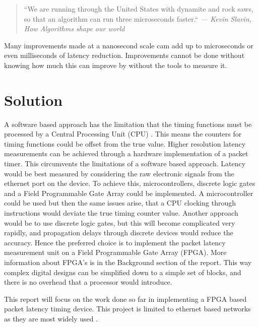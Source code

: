 \begin{quote}
    \centering
    ``We are running through the United States with dynamite and rock saws, so that an algorithm can
    run three microseconds faster.`` \em --- Kevin Slavin, How Algorithms shape our world \cite{tedTalkAlgorithms}
\end{quote} 

Many improvements made at a nanosecond scale cam add up to microseconds or even milliseconds of latency
reduction. Improvements cannot be done without knowing how much this can improve by without the tools to measure it.

\section{Solution}

\par A software based approach has the limitation that the timing functions must be processed by a
Central Processing Unit (CPU) \cite{CPUtiming}. This means the counters for timing functions could be offset from the true value. Higher
resolution latency measurements can be achieved through a hardware implementation of a packet
timer. This circumvents the limitations of a software based approach.
Latency would be best measured by considering the raw electronic signals from the ethernet port on
the device. To achieve this, microcontrollers, discrete logic gates and a Field Programmable Gate
Array could be implemented. A microcontroller could be used but then the same issues arise, that a
CPU clocking through instructions would deviate the true timing counter value. Another approach
would be to use discrete logic gates, but this will become complicated very rapidly, and propagation
delays through discrete devices would reduce the accuracy. Hence the preferred choice is to
implement the packet latency measurement unit on a Field Programmable Gate Array (FPGA). More
information about FPGA’s is in the Background section of the report. This way complex digital
designs can be simplified down to a simple set of blocks, and there is no overhead that a processor
would introduce.

\par This report will focus on the work done so far in implementing a FPGA based packet latency timing
device. This project is limited to ethernet based networks as they are most widely used \cite{etherneteverywhere}.
